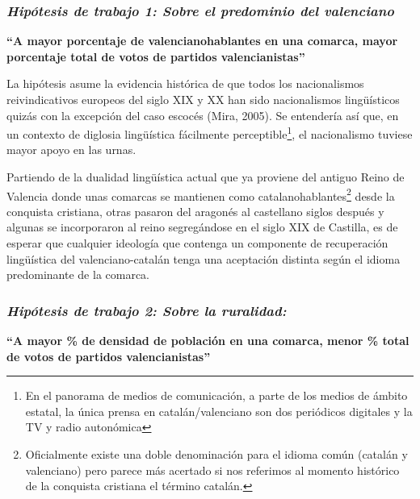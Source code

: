 \documentclass[
]{article}
\begin{document}
\hypertarget{hipuxf3tesis-de-trabajo-1-sobre-el-predominio-del-valenciano}{%
\subsubsection{\texorpdfstring{\emph{Hipótesis de trabajo 1: Sobre el
predominio del
valenciano}}{Hipótesis de trabajo 1: Sobre el predominio del valenciano}}\label{hipuxf3tesis-de-trabajo-1-sobre-el-predominio-del-valenciano}}

\textbf{``A mayor porcentaje de valencianohablantes en una comarca,
mayor porcentaje total de votos de partidos valencianistas''}

La hipótesis asume la evidencia histórica de que todos los nacionalismos
reivindicativos europeos del siglo XIX y XX han sido nacionalismos
lingüísticos quizás con la excepción del caso escocés (Mira, 2005). Se
entendería así que, en un contexto de diglosia lingüística fácilmente
perceptible\footnote{En el panorama de medios de comunicación, a parte
  de los medios de ámbito estatal, la única prensa en catalán/valenciano
  son dos periódicos digitales y la TV y radio autonómica}, el
nacionalismo tuviese mayor apoyo en las urnas.

Partiendo de la dualidad lingüística actual que ya proviene del antiguo
Reino de Valencia donde unas comarcas se mantienen como
catalanohablantes\footnote{Oficialmente existe una doble denominación
  para el idioma común (catalán y valenciano) pero parece más acertado
  si nos referimos al momento histórico de la conquista cristiana el
  término catalán.} desde la conquista cristiana, otras pasaron del
aragonés al castellano siglos después y algunas se incorporaron al reino
segregándose en el siglo XIX de Castilla, es de esperar que cualquier
ideología que contenga un componente de recuperación lingüística del
valenciano-catalán tenga una aceptación distinta según el idioma
predominante de la comarca.

\hypertarget{hipuxf3tesis-de-trabajo-2-sobre-la-ruralidad}{%
\subsubsection{\texorpdfstring{\emph{Hipótesis de trabajo 2: Sobre la
ruralidad:}}{Hipótesis de trabajo 2: Sobre la ruralidad:}}\label{hipuxf3tesis-de-trabajo-2-sobre-la-ruralidad}}

\textbf{``A mayor \% de densidad de población en una comarca, menor \%
total de votos de partidos valencianistas''}
\end{document}
